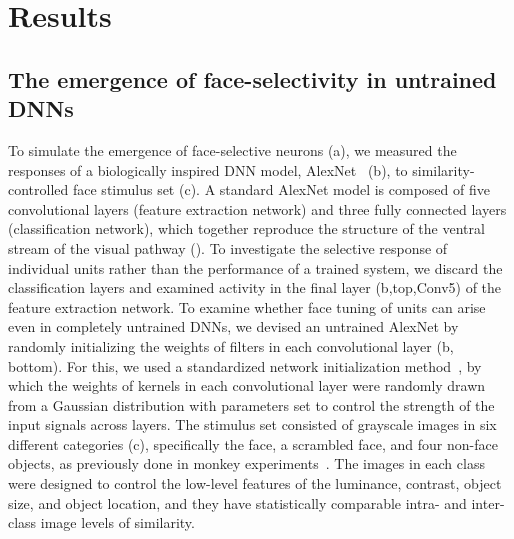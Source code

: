 \documentclass[final,3p,times,twocolumn]{elsarticle}
\begin{document}
\section{Results} 

\subsection{The emergence of face-selectivity in untrained DNNs}\par
To simulate the emergence of face-selective neurons (a), we measured the responses of a biologically inspired DNN model, AlexNet~\cite{krizhevsky2012imagenet} (b), to similarity-controlled face stimulus set (c).
A standard AlexNet model is composed of five convolutional layers (feature extraction network) and three fully connected layers (classification network), which together reproduce the structure of the ventral stream of the visual pathway ().
To investigate the selective response of individual units rather than the performance of a trained system, 
we discard the classification layers and examined activity in the final layer (b,top,Conv5) of the feature extraction network.
To examine whether face tuning of units can arise even in completely untrained DNNs, 
we devised an untrained AlexNet by randomly initializing the weights of filters in each convolutional layer (b, bottom).
For this, we used a standardized network initialization method~\cite{lecun2012efficient}, by which the weights of kernels in each convolutional layer were randomly drawn from a Gaussian distribution with parameters set to control the strength of the input signals across layers.
The stimulus set consisted of grayscale images in six different categories (c), specifically the face, a scrambled face, and four non-face objects, as previously done in monkey experiments~\cite{stigliani2015temporal}.
The images in each class were designed to control the low-level features of the luminance, contrast, object size, and object location, and they have statistically comparable intra- and inter-class image levels of similarity.
\end{document}
